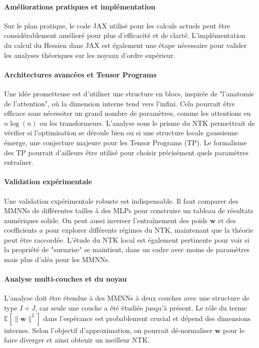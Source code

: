 \paragraph{Améliorations pratiques et implémentation}
Sur le plan pratique, le code JAX utilisé pour les calculs actuels peut être considérablement amélioré pour plus d'efficacité et de clarté. L'implémentation du calcul du Hessien dans JAX est également une étape nécessaire pour valider les analyses théoriques sur les noyaux d'ordre supérieur.

\paragraph{Architectures avancées et Tensor Programs}
Une idée prometteuse est d'utiliser une structure en blocs, inspirée de "l'anatomie de l'attention", où la dimension interne tend vers l'infini. Cela pourrait être efficace sans nécessiter un grand nombre de paramètres, comme les attentions en $n\log(n)$ ou les transformeurs. L'analyse sous le prisme du NTK permettrait de vérifier si l'optimisation se déroule bien ou si une structure locale gaussienne émerge, une conjecture majeure pour les Tensor Programs (TP). Le formalisme des TP pourrait d'ailleurs être utilisé pour choisir précisément quels paramètres entraîner.

\paragraph{Validation expérimentale}
Une validation expérimentale robuste est indispensable. Il faut comparer des MMNNs de différentes tailles à des MLPs pour construire un tableau de résultats numériques solide. On peut aussi inverser l'entraînement des poids $\bm{w}$ et des coefficients $a$ pour explorer différents régimes du NTK, maintenant que la théorie peut être raccordée. L'étude du NTK local est également pertinente pour voir si la propriété de "surmrise" se maintient, dans un cadre avec moins de paramètres mais plus d'aléa pour les MMNNs.

\paragraph{Analyse multi-couches et du noyau}
L'analyse doit être étendue à des MMNNs à deux couches avec une structure de type $I+J$, car seule une couche a été étudiée jusqu'à présent. Le rôle du terme $\mathbb{E}[\|\bm{w}\|^2]$ dans l'espérance est probablement crucial et dépend des dimensions internes. Selon l'objectif d'approximation, on pourrait dé-normaliser $\bm{w}$ pour le faire diverger et ainsi obtenir un meilleur NTK.

